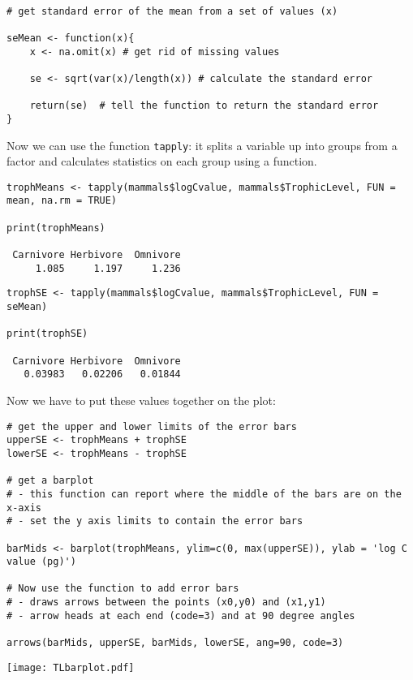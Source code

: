 \begin{lstlisting}
	
# get standard error of the mean from a set of values (x)

seMean <- function(x){
	x <- na.omit(x) # get rid of missing values

	se <- sqrt(var(x)/length(x)) # calculate the standard error

	return(se) 	# tell the function to return the standard error
}

\end{lstlisting}
	
Now we can use the function {\tt tapply}: it splits a variable up into 
groups from a factor and calculates statistics on each group using a 
function.
\begin{lstlisting}
trophMeans <- tapply(mammals$logCvalue, mammals$TrophicLevel, FUN = 
mean, na.rm = TRUE)

print(trophMeans)

 Carnivore Herbivore  Omnivore 
     1.085     1.197     1.236 
\end{lstlisting}

\begin{lstlisting}
trophSE <- tapply(mammals$logCvalue, mammals$TrophicLevel, FUN = seMean)

print(trophSE)

 Carnivore Herbivore  Omnivore 
   0.03983   0.02206   0.01844 
\end{lstlisting}

Now we have to put these values together on the plot:

\begin{lstlisting}
# get the upper and lower limits of the error bars
upperSE <- trophMeans + trophSE
lowerSE <- trophMeans - trophSE

# get a barplot
# - this function can report where the middle of the bars are on the x-axis
# - set the y axis limits to contain the error bars

barMids <- barplot(trophMeans, ylim=c(0, max(upperSE)), ylab = 'log C value (pg)')

# Now use the function to add error bars
# - draws arrows between the points (x0,y0) and (x1,y1)
# - arrow heads at each end (code=3) and at 90 degree angles

arrows(barMids, upperSE, barMids, lowerSE, ang=90, code=3)

\end{lstlisting}

\begin{center}
	\texttt{[image: TLbarplot.pdf]}
\end{center} 

